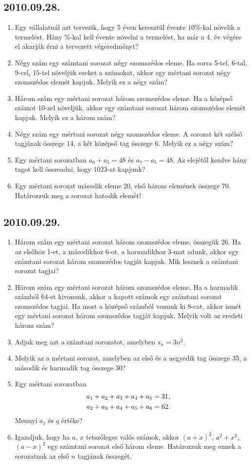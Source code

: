 \subsection*{2010.09.28.}
\begin{enumerate}
\item Egy vállalatnál azt tervezik, hogy 5 éven keresztül évente 10\%-kal növelik a termelést. Hány \%-kal kell évente növelni a termelést, ha már a 4. év végére el akarják érni a tervezett végeredményt?
\item Négy szám egy számtani sorozat négy szomszédos eleme. Ha sorra 5-tel, 6-tal, 9-cel, 15-tel növeljük ezeket a számokat, akkor egy mértani sorozat négy szomszédos elemét kapjuk. Melyik ez a négy szám?
\item Három szám egy mértani sorozat három szomszédos eleme. Ha a középső számot 10-zel növeljük, akkor egy számtani sorozat három szomszédos elemét kapjuk. Melyik ez a három szám?
\item Négy szám egy mértani sorozat négy szomszédos eleme. A sorozat két szélső tagjának összege 14, a két középső tag összege 6. Melyik ez a négy szám?
\item Egy mértani sorozatban $a_6+a_5=48$ és $a_7-a_5=48$. Az elejétől kezdve hány tagot kell összeadni, hogy 1023-at kapjunk?
\item Egy mértani sorozat második eleme 20, első három elemének összege 70. Határozzuk meg a sorozat hatodik elemét!
\end{enumerate}


\subsection*{2010.09.29.}
\begin{enumerate}
\item Három szám egy mértani sorozat három szomszédos eleme, összegük 26. Ha az elsőhöz 1-et, a másodikhoz 6-ot, a harmadikhoz 3-mat adunk, akkor egy számtani sorozat három szomszédos tagját kapjuk. Mik lesznek a számtani sorozat tagjai?
\item Három szám egy mértani sorozat három szomszédos eleme. Ha a harmadik számból 64-et kivonunk, akkor a kapott számok egy számtani sorozat szomszédos tagjai. Ha most a középső számból vonunk ki 8-cat, akkor ismét egy mértani sorozat három szomszédos tagját kapjuk. Melyik volt az eredeti három szám?
\item Adjuk meg azt a számtani sorozatot, amelyben
$s_n=3n^2$.
\item Melyik az a mértani sorozat, amelyben az első és a negyedik tag összege 35, a második és harmadik tag összege 30?
\item Egy mértani sorozatban
\begin{align*}
a_1+a_2+a_3+a_4+a_5&=31,\cr
a_2+a_3+a_4+a_5+a_6&=62.
\end{align*}
Mennyi $a_1$ és $q$ értéke?
\item Igazoljuk, hogy ha $a$, $x$ tetszőleges valós számok, akkor
$(a+x)^2$, $a^2+x^2$, $(a-x)^2$ egy számtani sorozat első három eleme. Határozzuk meg ennek a sorozatnak az első $n$ tagjának összegét.
\end{enumerate}


